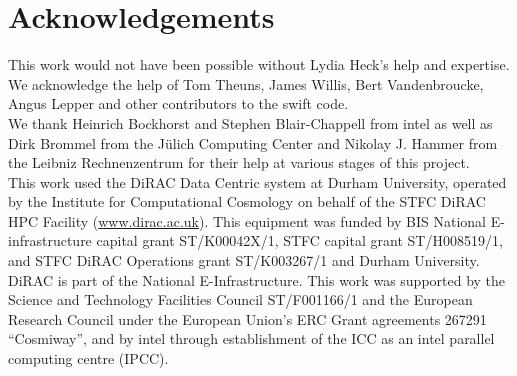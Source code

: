 \documentclass{sig-alternate-05-2015}
\newcommand{\swift}{{\sc swift}\xspace}
\begin{document}
\section{Acknowledgements}
This work would not have been possible without Lydia Heck's help and
expertise. We acknowledge the help of Tom Theuns, James Willis, Bert
Vandenbroucke, Angus Lepper and other contributors to the \swift
code. \\ We thank Heinrich Bockhorst and Stephen Blair-Chappell from {\sc
  intel} as well as Dirk Brommel from the J\"ulich Computing Center
and Nikolay J. Hammer from the Leibniz Rechnenzentrum for their help
at various stages of this project.\\ This work used the DiRAC Data
Centric system at Durham University, operated by the Institute for
Computational Cosmology on behalf of the STFC DiRAC HPC Facility
(\url{www.dirac.ac.uk}). This equipment was funded by BIS National
E-infrastructure capital grant ST/K00042X/1, STFC capital grant
ST/H008519/1, and STFC DiRAC Operations grant ST/K003267/1 and Durham
University. DiRAC is part of the National E-Infrastructure. This work
was supported by the Science and Technology Facilities Council
ST/F001166/1 and the European Research Council under the European
Union's ERC Grant agreements 267291 ``Cosmiway'', and by {\sc intel}
through establishment of the ICC as an {\sc intel} parallel computing
centre (IPCC).



\end{document}
